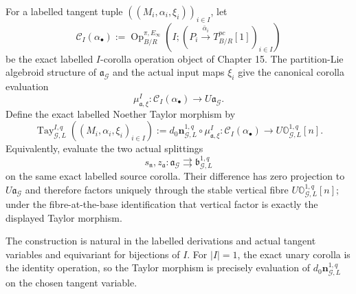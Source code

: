 \begin{construction}
\label{constr:symmetry-noether-exact-labelled-taylor-class-of-the-noether-splitting}
For a labelled tangent tuple $((M_i,\alpha_i,\xi_i))_{i\in I}$, let
\[
\mathcal C_I(\alpha_\bullet)
:=
\operatorname{Op}^{\pi,E_\infty}_{B/R}
\left(
I;
\left(
P_i\xrightarrow{\bar\alpha_i}T^{pc}_{B/R}[1]
\right)_{i\in I}
\right)
\]
be the exact labelled $I$-corolla operation object of Chapter 15.  The
partition-Lie algebroid structure of $\mathfrak a_{\mathcal G}$ and the actual input
maps $\xi_i$ give the canonical corolla evaluation
\[
\mu^{I}_{\mathfrak a,\xi}:
\mathcal C_I(\alpha_\bullet)
\longrightarrow
U\mathfrak a_{\mathcal G}.
\]
Define the exact labelled Noether Taylor morphism by
\[
\boxed{
\operatorname{Tay}_{\mathcal G,L}^{I,q}
\left((M_i,\alpha_i,\xi_i)_{i\in I}\right)
:=
 d_0\mathbf n_{\mathcal G,L}^{1,q}
 \circ
 \mu^{I}_{\mathfrak a,\xi}:
\mathcal C_I(\alpha_\bullet)
\longrightarrow
U\mathbb O_{\mathcal G,L}^{1,q}[n].
}
\]
Equivalently, evaluate the two actual splittings
\[
s_{\mathfrak n},z_{\mathfrak a}:
\mathfrak a_{\mathcal G}
\rightrightarrows
\mathfrak b_{\mathcal G,L}^{1,q}
\]
on the same exact labelled source corolla.  Their difference has zero projection to
$U\mathfrak a_{\mathcal G}$ and therefore factors uniquely through the stable
vertical fibre $U\mathbb O_{\mathcal G,L}^{1,q}[n]$; under the fibre-at-the-base
identification that vertical factor is exactly the displayed Taylor morphism.

The construction is natural in the labelled derivations and actual tangent
variables and equivariant for bijections of $I$.  For $|I|=1$, the exact unary
corolla is the identity operation, so the Taylor morphism is precisely evaluation
of $d_0\mathbf n_{\mathcal G,L}^{1,q}$ on the chosen tangent variable.
\end{construction}


